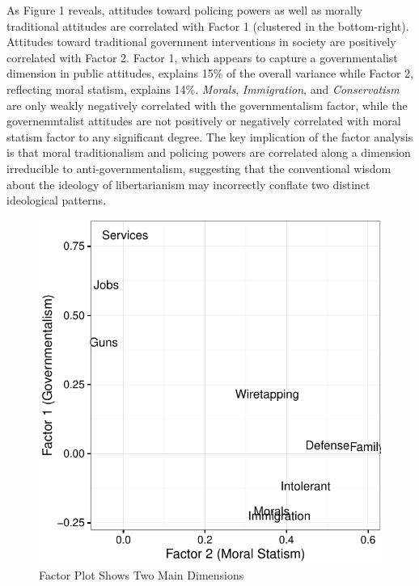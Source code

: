 \documentclass[12pt,]{article}
\begin{document}
As Figure 1 reveals, attitudes toward policing powers as well as morally
traditional attitudes are correlated with Factor 1 (clustered in the
bottom-right). Attitudes toward traditional government interventions in
society are positively correlated with Factor 2. Factor 1, which appears
to capture a governmentalist dimension in public attitudes, explains
15\% of the overall variance while Factor 2, reflecting moral statism,
explains 14\%. \emph{Morals}, \emph{Immigration}, and
\emph{Conservatism} are only weakly negatively correlated with the
governmentalism factor, while the governemntalist attitudes are not
positively or negatively correlated with moral statism factor to any
significant degree. The key implication of the factor analysis is that
moral traditionalism and policing powers are correlated along a
dimension irreducible to anti-governmentalism, suggesting that the
conventional wisdom about the ideology of libertarianism may incorrectly
conflate two distinct ideological patterns.

\begin{figure}[htbp]
\centering
\includegraphics{figures/factorplot-1.pdf}
\caption{Factor Plot Shows Two Main Dimensions}
\end{figure}
\end{document}
